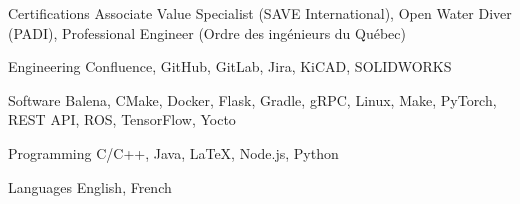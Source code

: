 \begin{cvskills}

  \cvskill
  {Certifications}
  {
    Associate Value Specialist (SAVE International),
    Open Water Diver (PADI),
    Professional Engineer (Ordre des ingénieurs du Québec)
  }

  \cvskill
  {Engineering}
  {
    Confluence,
    GitHub,
    GitLab,
    Jira,
    KiCAD,
    SOLIDWORKS
  }

  \cvskill
  {Software}
  {
    Balena,
    CMake,
    Docker,
    Flask,
    Gradle,
    gRPC,
    Linux,
    Make,
    PyTorch,
    REST API,
    ROS,
    TensorFlow,
    Yocto
  }

  \cvskill
  {Programming}
  {
    C/C++,
    Java,
    LaTeX,
    Node.js,
    Python
  }

  \cvskill
  {Languages}
  {
    English,
    French
  }

\end{cvskills}
